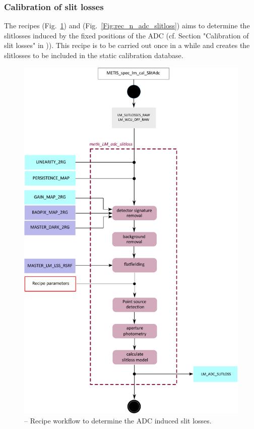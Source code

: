 \subsubsection{Calibration of slit losses}\label{sssec:adc_slitlosses}
The recipes \hyperref[rec:metis_lm_adc_slitloss]{} (Fig.~\ref{Fig:rec_lm_adc_slitloss}) and \hyperref[rec:metis_n_adc_slitloss]{} (Fig.~\ref{Fig:rec_n_adc_slitloss}) aims to determine the slitlosses induced by the fixed positions of the \ac{ADC} (cf. Section "Calibration of slit losses" in  \cite{METIS-calibration_plan})). This recipe is to be carried out once in a while and creates the slitlosses to be included in the static calibration database.
\begin{figure}[ht]
  \centering
  \includegraphics[width=0.5\textheight]{figures/metis_lm_lss_adc_slitloss_v0.83.pdf}
  \caption[Recipe: ]{ --
    Recipe workflow to determine the \ac{ADC} induced slit losses.}
  \label{Fig:rec_lm_adc_slitloss}
\end{figure}

